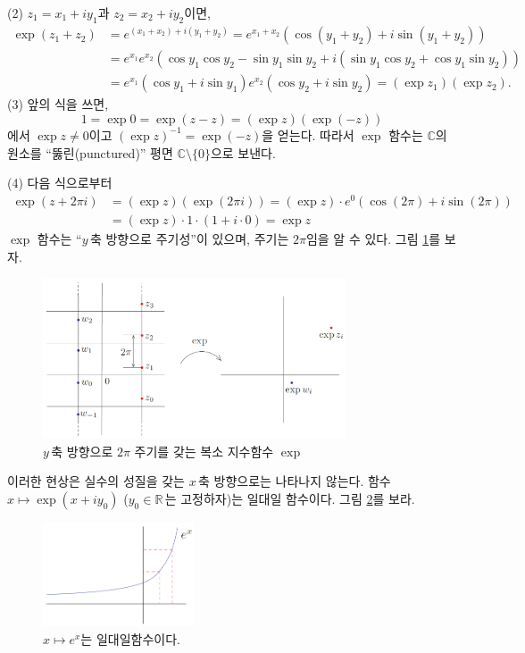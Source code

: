 \noindent
(2)  $z_1 = x_1 + iy_1$과 $z_2 = x_2 + iy_2$이면,
\begin{align*}
\exp(z_1+z_2)
&= e^{(x_1+x_2) + i(y_1+y_2)} = e^{x_1+x_2}
\left( \cos(y_1+y_2) + i\sin(y_1+y_2) \right) \\
&= e^{x_1}e^{x_2} \left( \cos y_1 \cos y_2 - \sin y_1\sin y_2
+ i(\sin y_1\cos y_2 + \cos y_1\sin y_2) \right) \\
&= e^{x_1} (\cos y_1 + i\sin y_1)  e^{x_2} (\cos y_2 + i\sin y_2)  
= (\exp z_1)(\exp z_2).
\end{align*}
(3) 앞의 식을 쓰면,
$$
1  = \exp 0 = \exp (z-z) = (\exp z)(\exp (-z))
$$
에서 $\exp z \ne 0$이고 $(\exp z)^{-1} = \exp(-z)$을 얻는다.
따라서 $\exp$ 함수는 $\mathbb C$의 원소를 
``뚫린(punctured)'' 평면 $\mathbb C\setminus \{0\}$으로 보낸다.

\noindent
(4) 다음 식으로부터
\begin{align*}
\exp(z+2\pi i)
&= (\exp z)(\exp (2\pi i)) = (\exp z)\cdot e^0(\cos(2\pi) + i\sin(2\pi)) \\
&= (\exp z)\cdot 1\cdot(1+i\cdot 0) = \exp z
\end{align*}
$\exp$ 함수는 ``$y\,$축 방향으로 주기성''이 있으며, 주기는 $2\pi$임을 알 수 있다.
그림 \ref{fig-1-14}를 보자.

\begin{figure}[!h]
\begin{center}
\includegraphics[width=0.8\textwidth]{./SaltChapter/figs/fig-1-14}
\end{center}
\caption{$y\,$축 방향으로 $2\pi$ 주기를 갖는 복소 지수함수 $\exp$}
\label{fig-1-14}
\end{figure}

이러한 현상은 실수의 성질을 갖는 $x\,$축 방향으로는 나타나지 않는다.
함수 $x\mapsto \exp(x+iy_0)$ ($y_0\in \mathbb R\,$는 고정하자)는 일대일 함수이다.
그림 \ref{fig-1-15}를 보라.

\begin{figure}[!h]
\begin{center}
\includegraphics[width=0.4\textwidth]{./SaltChapter/figs/fig-1-15}
\end{center}
\caption{$x\mapsto e^x$는 일대일함수이다.}
\label{fig-1-15}
\end{figure}

